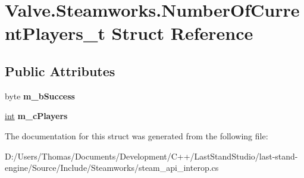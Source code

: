 \hypertarget{structValve_1_1Steamworks_1_1NumberOfCurrentPlayers__t}{}\section{Valve.\+Steamworks.\+Number\+Of\+Current\+Players\+\_\+t Struct Reference}
\label{structValve_1_1Steamworks_1_1NumberOfCurrentPlayers__t}
\subsection*{Public Attributes}
\begin{DoxyCompactItemize}
\item 
\hypertarget{structValve_1_1Steamworks_1_1NumberOfCurrentPlayers__t_a99f198eb9ba3dd62b76816c2fb90d121}{}byte {\bfseries m\+\_\+b\+Success}\label{structValve_1_1Steamworks_1_1NumberOfCurrentPlayers__t_a99f198eb9ba3dd62b76816c2fb90d121}

\item 
\hypertarget{structValve_1_1Steamworks_1_1NumberOfCurrentPlayers__t_a6c31b37b2c3fc429f678af199c9b122c}{}\hyperlink{SDL__thread_8h_a6a64f9be4433e4de6e2f2f548cf3c08e}{int} {\bfseries m\+\_\+c\+Players}\label{structValve_1_1Steamworks_1_1NumberOfCurrentPlayers__t_a6c31b37b2c3fc429f678af199c9b122c}

\end{DoxyCompactItemize}


The documentation for this struct was generated from the following file\+:\begin{DoxyCompactItemize}
\item 
D\+:/\+Users/\+Thomas/\+Documents/\+Development/\+C++/\+Last\+Stand\+Studio/last-\/stand-\/engine/\+Source/\+Include/\+Steamworks/steam\+\_\+api\+\_\+interop.\+cs\end{DoxyCompactItemize}
